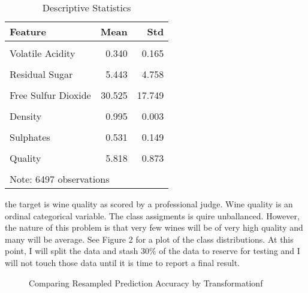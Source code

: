 \documentclass[16pt,twocolumn,letterpaper,titlepage]{article}
\begin{document}
\begin{table}[!h]

\caption{Descriptive Statistics}
\centering
\begin{tabular}[t]{lrr}
\toprule
Feature & Mean & Std\\
\midrule
\cellcolor{gray!6}{Fixed Acidity} & \cellcolor{gray!6}{7.215} & \cellcolor{gray!6}{1.296}\\
Volatile Acidity & 0.340 & 0.165\\
\cellcolor{gray!6}{Citric Acid} & \cellcolor{gray!6}{0.319} & \cellcolor{gray!6}{0.145}\\
Residual Sugar & 5.443 & 4.758\\
\cellcolor{gray!6}{Chlorides} & \cellcolor{gray!6}{0.056} & \cellcolor{gray!6}{0.035}\\
\addlinespace
Free Sulfur Dioxide & 30.525 & 17.749\\
\cellcolor{gray!6}{Total Sulfur Dioxide} & \cellcolor{gray!6}{115.745} & \cellcolor{gray!6}{56.522}\\
Density & 0.995 & 0.003\\
\cellcolor{gray!6}{Ph} & \cellcolor{gray!6}{3.219} & \cellcolor{gray!6}{0.161}\\
Sulphates & 0.531 & 0.149\\
\addlinespace
\cellcolor{gray!6}{Alcohol} & \cellcolor{gray!6}{10.492} & \cellcolor{gray!6}{1.193}\\
Quality & 5.818 & 0.873\\
\cellcolor{gray!6}{Is Red} & \cellcolor{gray!6}{0.246} & \cellcolor{gray!6}{0.431}\\
\bottomrule
\multicolumn{3}{l}{Note: 6497 observations}\\
\end{tabular}
\end{table}



the target is wine quality as scored by a professional judge. Wine quality is an ordinal categorical variable. The class assigments is quire unballanced. However, the nature of this problem is that very few wines will be of very high quality and many will be average. See Figure 2 for a plot of the class distributions. At this point, I will split the data and stash 30\% of the data to reserve for testing and I will not touch those data until it is time to report a final result.

\begin{figure}[!htb]
	\caption{\label{fig:my-label} Comparing Resampled Prediction Accuracy by Transformationf}
\end{figure}
\end{document}
